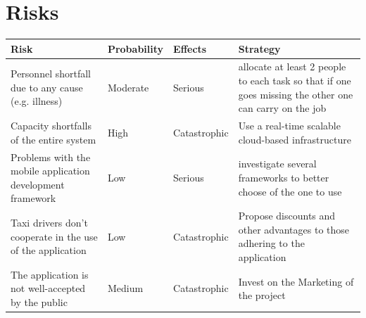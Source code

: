 \documentclass{article}
\begin{document}
\section{Risks}
\begin{table}[H]
	\begin{adjustbox}{width = 1.2\textwidth}
	\begin{tabular}{*{4}{p{}}}
		\toprule
		Risk & Probability & Effects & Strategy\\
		\midrule
		Personnel shortfall due to any cause (e.g. illness) & Moderate & Serious & allocate at least 2 people to each task so that if one goes missing the other one can carry on the job\\
		Capacity shortfalls of the entire system & High & Catastrophic & Use a real-time scalable cloud-based infrastructure  \\
		Problems with the mobile application development framework & Low & Serious & investigate several frameworks to better choose of the one to use\\
		Taxi drivers don't cooperate in the use of the application & Low & Catastrophic & Propose discounts and other advantages to those adhering to the application\\		
		The application is not well-accepted by the public & Medium & Catastrophic & Invest on the Marketing of the project \\
		\bottomrule
	\end{tabular}
	\end{adjustbox}
\end{table}
\end{document}
